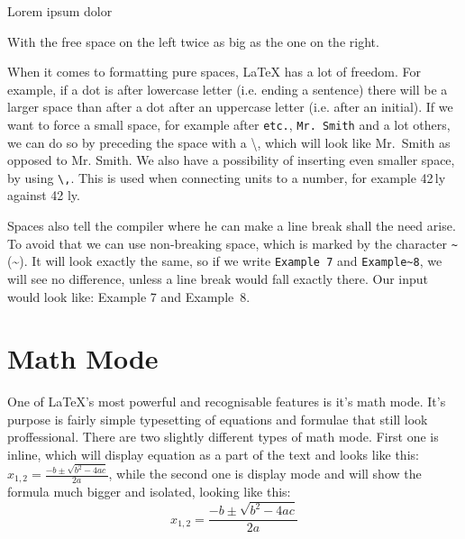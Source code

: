 Lorem \hfill \hfill ipsum \hfill dolor

With the free space on the left twice as big as the one on the right.

When it comes to formatting pure spaces, LaTeX has a lot of freedom. For example, if a dot is after lowercase letter (i.e. ending a sentence) there will be a larger space than after a dot after an uppercase letter (i.e. after an initial). If we want to force a small space, for example after \verb|etc.|, \verb|Mr. Smith| and a lot others, we can do so by preceding the space with a \textbackslash, which will look like Mr.\ Smith as opposed to Mr. Smith. We also have a possibility of inserting even smaller space, by using \verb|\,|. This is used when connecting units to a number, for example 42\,ly against 42 ly.

Spaces also tell the compiler where he can make a line break shall the need arise. To avoid that we can use non-breaking space, which is marked by the character \verb|~| (\textasciitilde{}). It will look exactly the same, so if we write \verb|Example 7| and \verb|Example~8|, we will see no difference, unless a line break would fall exactly there. Our input would look like: Example 7 and Example~8.

\section{Math Mode}

One of \LaTeX{}'s most powerful and recognisable features is it's math mode. It's purpose is fairly simple typesetting of equations and formulae that still look proffessional. There are two slightly different types of math mode. First one is inline, which will display equation as a part of the text and looks like this: $x_{1,2} = \frac{-b\pm \sqrt{b^2-4ac}}{2a}$, while the second one is display mode and will show the formula much bigger and isolated, looking like this: $$x_{1,2} = \frac{-b\pm \sqrt{b^2-4ac}}{2a}$$ %